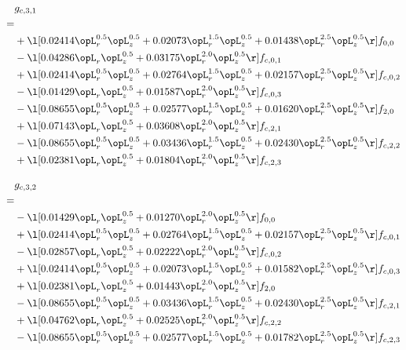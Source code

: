 \begin{alignat}{2} 
\label{eq:g_31_0} 
& g_{c,3,1} \nonumber \\ 
 = \\ 
& + \l[  0.02414 \opL_r^{0.5} \opL_z^{0.5} +  0.02073 \opL_r^{1.5} \opL_z^{0.5} +  0.01438 \opL_r^{2.5} \opL_z^{0.5}  \r] f_{0,0} \nonumber \\ 
& - \l[  0.04286 \opL_r \opL_z^{0.5} +  0.03175 \opL_r^{2.0} \opL_z^{0.5}  \r] f_{c,0,1} \nonumber \\ 
& + \l[  0.02414 \opL_r^{0.5} \opL_z^{0.5} +  0.02764 \opL_r^{1.5} \opL_z^{0.5} +  0.02157 \opL_r^{2.5} \opL_z^{0.5}  \r] f_{c,0,2} \nonumber \\ 
& - \l[  0.01429 \opL_r \opL_z^{0.5} +  0.01587 \opL_r^{2.0} \opL_z^{0.5}  \r] f_{c,0,3} \nonumber \\ 
& - \l[  0.08655 \opL_r^{0.5} \opL_z^{0.5} +  0.02577 \opL_r^{1.5} \opL_z^{0.5} +  0.01620 \opL_r^{2.5} \opL_z^{0.5}  \r] f_{2,0} \nonumber \\ 
& + \l[  0.07143 \opL_r \opL_z^{0.5} +  0.03608 \opL_r^{2.0} \opL_z^{0.5}  \r] f_{c,2,1} \nonumber \\ 
& - \l[  0.08655 \opL_r^{0.5} \opL_z^{0.5} +  0.03436 \opL_r^{1.5} \opL_z^{0.5} +  0.02430 \opL_r^{2.5} \opL_z^{0.5}  \r] f_{c,2,2} \nonumber \\ 
& + \l[  0.02381 \opL_r \opL_z^{0.5} +  0.01804 \opL_r^{2.0} \opL_z^{0.5}  \r] f_{c,2,3} \nonumber \\ 
\end{alignat} 


\begin{alignat}{2} 
\label{eq:g_32_0} 
& g_{c,3,2} \nonumber \\ 
 = \\ 
& - \l[  0.01429 \opL_r \opL_z^{0.5} +  0.01270 \opL_r^{2.0} \opL_z^{0.5}  \r] f_{0,0} \nonumber \\ 
& + \l[  0.02414 \opL_r^{0.5} \opL_z^{0.5} +  0.02764 \opL_r^{1.5} \opL_z^{0.5} +  0.02157 \opL_r^{2.5} \opL_z^{0.5}  \r] f_{c,0,1} \nonumber \\ 
& - \l[  0.02857 \opL_r \opL_z^{0.5} +  0.02222 \opL_r^{2.0} \opL_z^{0.5}  \r] f_{c,0,2} \nonumber \\ 
& + \l[  0.02414 \opL_r^{0.5} \opL_z^{0.5} +  0.02073 \opL_r^{1.5} \opL_z^{0.5} +  0.01582 \opL_r^{2.5} \opL_z^{0.5}  \r] f_{c,0,3} \nonumber \\ 
& + \l[  0.02381 \opL_r \opL_z^{0.5} +  0.01443 \opL_r^{2.0} \opL_z^{0.5}  \r] f_{2,0} \nonumber \\ 
& - \l[  0.08655 \opL_r^{0.5} \opL_z^{0.5} +  0.03436 \opL_r^{1.5} \opL_z^{0.5} +  0.02430 \opL_r^{2.5} \opL_z^{0.5}  \r] f_{c,2,1} \nonumber \\ 
& + \l[  0.04762 \opL_r \opL_z^{0.5} +  0.02525 \opL_r^{2.0} \opL_z^{0.5}  \r] f_{c,2,2} \nonumber \\ 
& - \l[  0.08655 \opL_r^{0.5} \opL_z^{0.5} +  0.02577 \opL_r^{1.5} \opL_z^{0.5} +  0.01782 \opL_r^{2.5} \opL_z^{0.5}  \r] f_{c,2,3} \nonumber \\ 
\end{alignat} 


